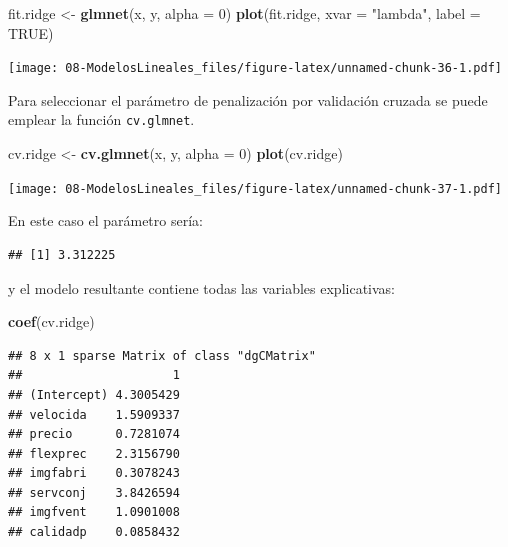 \documentclass[]{book}
\newenvironment{Shaded}{\begin{snugshade}}{\end{snugshade}}
\newcommand{\KeywordTok}[1]{\textcolor[rgb]{0.13,0.29,0.53}{\textbf{#1}}}
\newcommand{\DataTypeTok}[1]{\textcolor[rgb]{0.13,0.29,0.53}{#1}}
\newcommand{\DecValTok}[1]{\textcolor[rgb]{0.00,0.00,0.81}{#1}}
\newcommand{\StringTok}[1]{\textcolor[rgb]{0.31,0.60,0.02}{#1}}
\newcommand{\OtherTok}[1]{\textcolor[rgb]{0.56,0.35,0.01}{#1}}
\newcommand{\OperatorTok}[1]{\textcolor[rgb]{0.81,0.36,0.00}{\textbf{#1}}}
\newcommand{\NormalTok}[1]{#1}
\begin{document}
\begin{Shaded}
\begin{Highlighting}[]
\NormalTok{fit.ridge <-}\StringTok{ }\KeywordTok{glmnet}\NormalTok{(x, y, }\DataTypeTok{alpha =} \DecValTok{0}\NormalTok{)}
\KeywordTok{plot}\NormalTok{(fit.ridge, }\DataTypeTok{xvar =} \StringTok{"lambda"}\NormalTok{, }\DataTypeTok{label =} \OtherTok{TRUE}\NormalTok{)}
\end{Highlighting}
\end{Shaded}

\texttt{[image: 08-ModelosLineales\_files/figure-latex/unnamed-chunk-36-1.pdf]}

Para seleccionar el parámetro de penalización por validación cruzada se
puede emplear la función \texttt{cv.glmnet}.

\begin{Shaded}
\begin{Highlighting}[]
\NormalTok{cv.ridge <-}\StringTok{ }\KeywordTok{cv.glmnet}\NormalTok{(x, y, }\DataTypeTok{alpha =} \DecValTok{0}\NormalTok{)}
\KeywordTok{plot}\NormalTok{(cv.ridge)}
\end{Highlighting}
\end{Shaded}

\texttt{[image: 08-ModelosLineales\_files/figure-latex/unnamed-chunk-37-1.pdf]}

En este caso el parámetro sería:

\begin{Shaded}
\end{Shaded}

\begin{verbatim}
## [1] 3.312225
\end{verbatim}

y el modelo resultante contiene todas las variables explicativas:

\begin{Shaded}
\begin{Highlighting}[]
\KeywordTok{coef}\NormalTok{(cv.ridge)}
\end{Highlighting}
\end{Shaded}

\begin{verbatim}
## 8 x 1 sparse Matrix of class "dgCMatrix"
##                     1
## (Intercept) 4.3005429
## velocida    1.5909337
## precio      0.7281074
## flexprec    2.3156790
## imgfabri    0.3078243
## servconj    3.8426594
## imgfvent    1.0901008
## calidadp    0.0858432
\end{verbatim}
\end{document}
